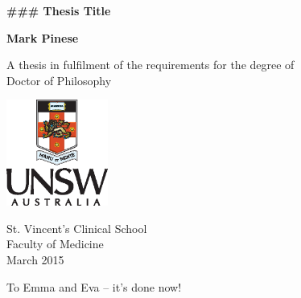 \documentclass[11pt,a4paper,final,twoside]{memoir}
\begin{document}
\increaseBuild
\cleardoublepage

\begin{titlepage}
    \begin{center}
        \vspace*{1cm}
        
        \Large
        \textbf{### Thesis Title}
        
        
        \vspace{1.5cm}
        
        \normalsize
        \textbf{Mark Pinese}
        
        \vfill
        
        A thesis in fulfilment of the requirements for the degree of\\
        Doctor of Philosophy
        
        \vspace{2cm}
        
        \includegraphics[width=0.25\textwidth]{resources/PortraitColourPos}

        \vspace{1cm}

        St. Vincent's Clinical School\\
        Faculty of Medicine\\

		\vspace{0.8cm}
        March 2015
    \end{center}
\end{titlepage}


\cleardoublepage


\frontmatter

\cleardoublepage
{}
\begin{adjustwidth}{2em}{2em}
\noindent %
To Emma and Eva --
\qquad it's done now!
\end{adjustwidth}
\end{document}
